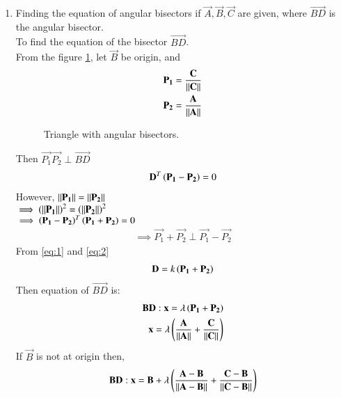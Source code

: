 \renewcommand{\theequation}{\theenumi}
\begin{enumerate}[label=\arabic*.,ref=\thesubsection.\theenumi]
\item Finding the equation of angular bisectors if $\vec{A}, \vec{B}, \vec{C}$ are given, where
$\vec{BD}$ is the angular bisector.
\\
\solution To find the equation of the bisector $\vec{BD}$.
\\ 
From the figure \ref{fig:proof}, let $\vec{B}$ be origin, and 
\begin{align}
\mathbf{P_1}=\frac{\mathbf{C}}{\left\lVert\mathbf{C}\right\rVert}
\\
\mathbf{P_2}=\frac{\mathbf{A}}{\left\lVert\mathbf{A}\right\rVert}
\end{align}
\begin{figure}[!ht]
	\begin{center}
			\resizebox{\columnwidth}{!}{}
	\end{center}
	\caption{Triangle with angular bisectors.}
	\label{fig:proof}	
\end{figure}
Then $\vec{P_1}\vec{P_2} \perp \vec{BD}$
\begin{align}
\label{eq:1}
\mathbf{D}^T \left(\mathbf{P_1}-\mathbf{P_2}\right) = 0
\end{align}
However, $\left\lVert\mathbf{P_1}\right\rVert=\left\lVert\mathbf{P_2}\right\rVert$
\\
$\implies \left(\left\lVert\mathbf{P_1}\right\rVert\right)^2=\left(\left\lVert\mathbf{P_2}\right\rVert\right)^2$
\\
$\implies \left(\mathbf{P_1}-\mathbf{P_2}\right)^T \left(\mathbf{P_1}+\mathbf{P_2}\right)=0$
\begin{align}
\label{eq:2}
\implies \vec{P_1}+\vec{P_2} \perp \vec{P_1}-\vec{P_2}
\end{align}
From \ref{eq:1} and \ref{eq:2} 
\begin{align}
\mathbf{D}=k \left(\mathbf{P_1}+\mathbf{P_2}\right)
\end{align}
Then equation of $\vec{BD}$ is:
\begin{align}
\mathbf{BD}: \mathbf{x}=\lambda \left(\mathbf{P_1}+\mathbf{P_2}\right) 
\\
\label{const:proof}
\mathbf{x}= \lambda \left(\frac{\mathbf{A}}{\left\lVert\mathbf{A}\right\rVert}+\frac{\mathbf{C}}{\left\lVert\mathbf{C}\right\rVert}\right)
\end{align}
If $\vec{B}$ is not at origin then,
\begin{align}
\mathbf{BD}: \mathbf{x}=\mathbf{B}+\lambda \left(\frac{\mathbf{A}-\mathbf{B}}{\left\lVert\mathbf{A}-\mathbf{B}\right\rVert}+\frac{\mathbf{C}-\mathbf{B}}{\left\lVert\mathbf{C}-\mathbf{B}\right\rVert}\right)
\end{align}

\end{enumerate}
